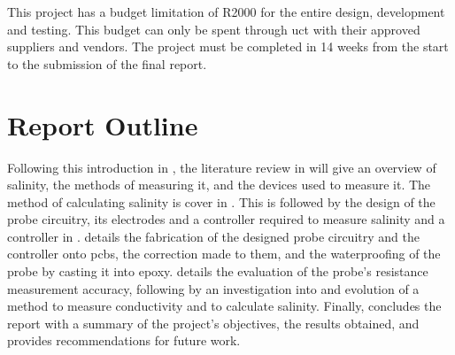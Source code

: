 This project has a budget limitation of R2000 for the entire design, development and testing.
This budget can only be spent through \gls{uct} with their approved suppliers and vendors.
The project must be completed in 14 weeks from the start to the submission of the final report.

\section{Report Outline}

Following this introduction in , the literature review in  will give an overview of salinity, the methods of measuring it, and the devices used to measure it.
The method of calculating salinity is cover in .
This is followed by the design of the probe circuitry, its electrodes and a controller required to measure salinity and a controller  in .
 details the fabrication of the designed probe circuitry and the controller onto \glspl{pcb}, the correction made to them, and the waterproofing of the probe by casting it into epoxy.
 details the evaluation of the probe's resistance measurement accuracy, following by an investigation into and evolution of a method to measure conductivity and to calculate salinity.
Finally,  concludes the report with a summary of the project's objectives, the results obtained, and  provides recommendations for future work.